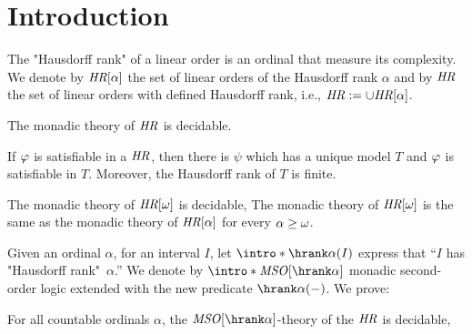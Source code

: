 \section{Introduction}

The "Hausdorff  rank" of a linear order is an ordinal that measure its  complexity.  
We denote by $\mathit{HR}[\alpha]$ the set of linear orders  of the Hausdorff  rank $\alpha$ and by $\mathit{HR}$ the set of linear orders  with defined Hausdorff  rank,  i.e., $\mathit{HR}:=\cup\mathit{HR}[\alpha]$.

\begin{theorem}[Decidability]  \label{th:dec}
The monadic theory of $\mathit{HR}$ is decidable. 
\end{theorem} 
\begin{theorem}\label{th:sm}
  If $\varphi$ is satisfiable in a $\mathit{HR}$, then 
   there is $\psi$ which has a unique model $T$  and $\varphi $ is satisfiable in $T$.
Moreover,  the Hausdorff rank of $T$ is finite. 
% 
   \end{theorem}
  

\begin{theorem}\label{th:code}
The monadic theory of  $\mathit{HR}[\omega]$  is decidable,
The monadic theory of  $\mathit{HR}[\omega]$ is the same as the monadic theory of  $\mathit{HR}[\alpha] $  for every $\alpha\geq \omega$.  
\end{theorem} 

Given an ordinal $\alpha$, for an interval $I$, let $\intro*\hrank\alpha(I)$ express that   ``$I$ has  "Hausdorff  rank"~$\alpha$.'' 
We denote by  $\intro*\MSO[\hrank\alpha]$ monadic second-order logic  extended with the new predicate $\hrank\alpha(-)$. We prove:

\begin{theorem}\label{th:main-hr} %
	For all countable ordinals $\alpha$,  
	 the $\MSO[\hrank\alpha]$-theory of the $\mathit{HR}$ is decidable,
	 \end{theorem}


